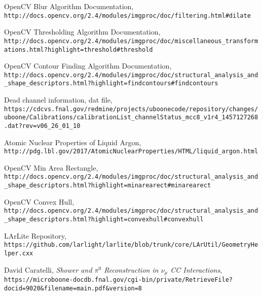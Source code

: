 \documentclass{article}
\begin{document}
\begin{thebibliography}{9}
  OpenCV Blur Algorithm Documentation, \\
  \texttt{http://docs.opencv.org/2.4/modules/imgproc/doc/filtering.html\#dilate}
  
  OpenCV Thresholding Algorithm Documentation, \\
  \texttt{http://docs.opencv.org/2.4/modules/imgproc/doc/miscellaneous\_transformations.html?highlight=threshold\#threshold}
  
  OpenCV Contour Finding Algorithm Documentation, \\
  \texttt{http://docs.opencv.org/2.4/modules/imgproc/doc/structural\_analysis\_and\_shape\_descriptors.html?highlight=findcontours\#findcontours}

  Dead channel information, dat file, \\
  \texttt{https://cdcvs.fnal.gov/redmine/projects/uboonecode/repository/changes/uboone/Calibrations/calibrationList\_channelStatus\_mcc8\_v1r4\_1457127268.dat?rev=v06\_26\_01\_10}

  Atomic Nuclear Properties of Liquid Argon, \\
  \texttt{http://pdg.lbl.gov/2017/AtomicNuclearProperties/HTML/liquid\_argon.html}

  OpenCV Min Area Rectangle, \\
  \texttt{http://docs.opencv.org/2.4/modules/imgproc/doc/structural\_analysis\_and\_shape\_descriptors.html?highlight=minarearect\#minarearect}

  OpenCV Convex Hull, \\
  \texttt{http://docs.opencv.org/2.4/modules/imgproc/doc/structural\_analysis\_and\_shape\_descriptors.html?highlight=convexhull\#convexhull}

  LArLite Repository, \\
\texttt{https://github.com/larlight/larlite/blob/trunk/core/LArUtil/GeometryHelper.cxx}




  David Caratelli, \emph{Shower and $\pi^0$ Reconstruction in $\nu_{\mu}$ CC Interactions},\\
  \texttt{https://microboone-docdb.fnal.gov/cgi-bin/private/RetrieveFile?docid=9020\&filename=main.pdf\&version=8}


\end{thebibliography}
\end{document}

